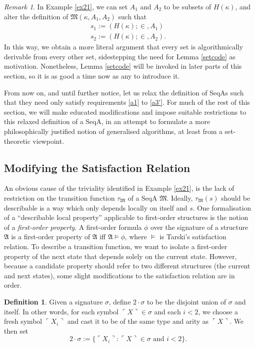 \documentclass[12pt, twoside]{memoir}
\numberwithin{equation}{section}
\theoremstyle{definition}
\newtheorem{defi}[thm]{Definition}
\theoremstyle{remark}
\newtheorem{rem}[thm]{Remark}
\theoremstyle{definition}
\theoremstyle{definition}
\theoremstyle{definition}
\theoremstyle{remark}
\begin{document}
\begin{rem}
In Example \ref{ex21}, we can set $A_1$ and $A_2$ to be subsets of $H(\kappa)$, and alter the definition of $\mathfrak{M}(\kappa, A_1, A_2)$ such that 
\begin{gather*}
    s_1 := (H(\kappa); \in, A_1) \\
    s_2 := (H(\kappa); \in, A_2) \text{.}
\end{gather*}
In this way, we obtain a more literal argument that every set is algorithmically derivable from every other set, sidestepping the need for Lemma \ref{setcode} as motivation. Nonetheless, Lemma \ref{setcode} will be invoked in later parts of this section, so it is as good a time now as any to introduce it.
\end{rem}

From now on, and until further notice, let us relax the definition of SeqAs such that they need only satisfy requirements \ref{a1} to \ref{a3'}. For much of the rest of this section, we will make educated modifications and impose suitable restrictions to this relaxed definition of a SeqA, in an attempt to formulate a more philosophically justified notion of generalised algorithms, at least from a set-theoretic viewpoint.

\subsection{Modifying the Satisfaction Relation}

An obvious cause of the triviality identified in Example \ref{ex21}, is the lack of restriction on the transition function $\tau_{\mathfrak{M}}$ of a SeqA $\mathfrak{M}$. Ideally, $\tau_{\mathfrak{M}}(s)$ should be describable is a way which only depends locally on itself and $s$. One formalisation of a ``describable local property'' applicable to first-order structures is the notion of a \emph{first-order property}. A first-order formula $\phi$ over the signature of a structure $\mathfrak{A}$ is a first-order property of $\mathfrak{A}$ iff $\mathfrak{A} \models \phi$, where $\models$ is Tarski's satisfaction relation. To describe a transition function, we want to isolate a first-order property of the next state that depends solely on the current state. However, because a candidate property should refer to two different structures (the current and next states), some slight modifications to the satisfaction relation are in order.

\begin{defi}
Given a signature $\sigma$, define $2 \cdot \sigma$ to be the disjoint union of $\sigma$ and itself. In other words, for each symbol $\ulcorner X \urcorner \in \sigma$ and each $i < 2$, we choose a fresh symbol $\ulcorner X_{i} \urcorner$ and cast it to be of the same type and arity as $\ulcorner X \urcorner$. We then set
\begin{equation*}
    2 \cdot \sigma := \{\ulcorner X_{i} \urcorner : \ulcorner X \urcorner \in \sigma \text{ and } i < 2\} \text{.}
\end{equation*}
\end{defi}
\end{document}
